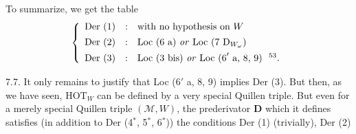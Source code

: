 To summarize, we get the table
\[
\left\{
\begin{array}{lcl}
\text{Der (1)} & : & \text{with no hypothesis on } W \\[1ex]
\text{Der (2)} & : & \text{Loc (6 a) \textit{or} Loc (7 }\mathrm{D}_{W_\omega}\text{)} \\[1ex]
\text{Der (3)} & : & \text{Loc (3 bis) \textit{or} Loc (6}'\text{ a, 8, 9)\ \ \footnotemark[53].}
\end{array}
\right.
\]

7.7. It only remains to justify that Loc (6$'$ a, 8, 9) implies Der (3). But then, as we have seen, $\mathrm{HOT}_W$ can be defined by a very special Quillen triple. But even for a merely special Quillen triple $(\mathcal{M},W)$, the prederivator $\mathbf{D}$ which it defines satisfies (in addition to Der (4$^*$, 5$^*$, 6$^*$)) the conditions Der (1) (trivially), Der (2)
